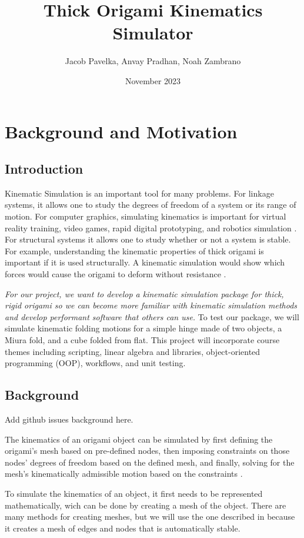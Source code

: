 \documentclass[letterpaper]{article}
\title{Thick Origami Kinematics Simulator}
\author{Jacob Pavelka, Anvay Pradhan, Noah Zambrano}
\date{November 2023}
\begin{document}
\maketitle

\section*{Background and Motivation}
\subsection*{Introduction}
Kinematic Simulation is an important tool for many problems. For linkage systems, it allows one to study the degrees of freedom of a system or its range of motion. For computer graphics, simulating kinematics is important for virtual reality training, video games, rapid digital prototyping, and robotics simulation \cite{SiggraphContact22}.
For structural systems it allows one to study whether or not a system is stable. For example, understanding the kinematic properties of thick origami is important if it is used structurally. A kinematic simulation would show which forces would cause the origami to deform without resistance \cite{filipov2015toward}. 

\textit{For our project, we want to develop a kinematic simulation package for thick, rigid origami so we can become more familiar with kinematic simulation methods and develop performant software that others can use.} To test our package, we will simulate kinematic folding motions for a simple hinge made of two objects, a Miura fold, and a cube folded from flat. This project will incorporate course themes including scripting, linear algebra and libraries, object-oriented programming (OOP), workflows, and unit testing.

\subsection*{Background}
Add github issues background here.

The kinematics of an origami object can be simulated by first defining the origami's mesh based on pre-defined nodes, then imposing constraints on those nodes' degrees of freedom based on the defined mesh, and finally, solving for the mesh's kinematically admissible motion based on the constraints \cite{zhu2022review}. 

To simulate the kinematics of an object, it first needs to be represented mathematically, wich can be done by creating a mesh of the object. There are many methods for creating meshes, but we will use the one described in \cite{zhang2021folding} because it creates a mesh of edges and nodes that is automatically stable.
\end{document}
